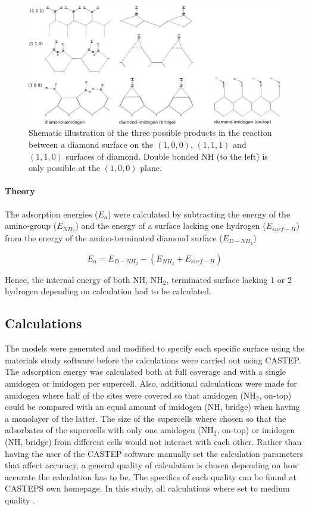 \documentclass[10pt,a4paper]{article}
\begin{document}
\begin{figure} \captionsetup{width=.8\linewidth} \caption{Shematic illustration of the three possible products in the reaction between a diamond surface on the $(1,  0,  0)$, $(1,  1, 1)$ and $(1,  1,  0)$ surfaces of diamond. Double bonded NH (to the left) is only possible at the $(1,  0,  0)$ plane.} \label{products}
%
\includegraphics[width=.8\linewidth]{pictures/products_new.png}
\end{figure}






\paragraph*{Theory}
The adsorption energies ($E_a$) were calculated by subtracting the energy of the amino-group ($E_{NH_2}$) and the energy of a surface lacking one hydrogen ($E_{surf-H}$) from the energy of the amino-terminated diamond surface ($E_{D-NH_2}$)


\begin{equation} E_{a} = E_{D-NH_2}-(E_{NH_2}+E_{surf-H}) \end{equation} 

Hence, the internal energy of both NH, NH$_2$, terminated surface lacking 1 or 2 hydrogen depending on calculation had to be calculated.

\subsection{Calculations}
The models were generated and modified to specify each specific surface using the materials study software before the calculations were carried out using CASTEP. The adsorption energy was calculated both at full coverage and with a single amidogen or imidogen per supercell. Also, additional calculations were made for amidogen where half of the sites were covered so that amidogen (NH$_2$, on-top) could be compared with an equal amount of imidogen (NH, bridge) when having a monolayer of the latter. The size of the supercells where chosen so that the adsorbates of the supercells with only one amidogen (NH$_2$, on-top) or imidogen (NH, bridge) from different cells would not interact with each other. Rather than having the user of the CASTEP software manually set the calculation parameters that affect accuracy, a general quality of calculation is chosen depending on how accurate the calculation has to be. The specifics of each quality can be found at CASTEPS own homepage. In this study, all calculations where set to medium quality \cite{Castep_user_guide}.
\end{document}
